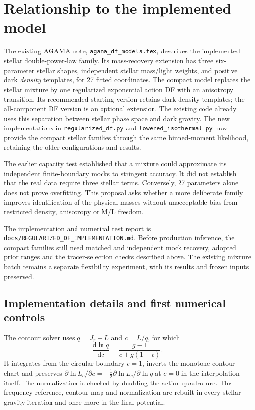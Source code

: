 \documentclass[11pt,a4paper]{article}
\newcommand{\dd}{\mathrm{d}}
\begin{document}
\section{Relationship to the implemented model}

The existing AGAMA note, \texttt{agama\_df\_models.tex}, describes the
implemented stellar double-power-law family. Its mass-recovery extension has
three six-parameter stellar shapes, independent stellar mass/light weights,
and positive dark \emph{density} templates, for 27 fitted coordinates.
The compact model replaces the stellar mixture by one regularized
exponential action DF with an anisotropy transition. Its recommended starting version retains dark density templates; the
all-component DF version is an optional extension. The existing code already
uses this separation between stellar phase space and dark gravity. The new
implementations in \nolinkurl{regularized_df.py} and
\nolinkurl{lowered_isothermal.py} now provide the compact stellar families
through the same binned-moment likelihood, retaining the older configurations
and results.

The earlier capacity test established that a mixture could approximate its
independent finite-boundary mocks to stringent accuracy. It did not establish
that the real data require three stellar terms. Conversely, 27 parameters
alone does not prove overfitting. This proposal asks whether a more deliberate
family improves identification of the physical masses without unacceptable
bias from restricted density, anisotropy or M/L freedom.

The implementation and numerical test report is
\nolinkurl{docs/REGULARIZED_DF_IMPLEMENTATION.md}. Before production inference,
the compact families still need matched and independent mock recovery,
adopted prior ranges and the tracer-selection checks described above. The
existing mixture batch remains a separate flexibility experiment, with its
results and frozen inputs preserved.

\subsection{Implementation details and first numerical controls}

The contour solver uses $q=J_r+L$ and $c=L/q$, for which
\begin{equation}
 \frac{\dd\ln q}{\dd c}=\frac{g-1}{c+g(1-c)}.
\end{equation}
It integrates from the circular boundary $c=1$, inverts the monotone contour
chart and preserves $\partial\ln L_c/\partial c=-\tfrac12
\partial\ln L_c/\partial\ln q$ at $c=0$ in the interpolation itself.
The normalization is checked by doubling the action quadrature. The
frequency reference, contour map and normalization are rebuilt in every
stellar-gravity iteration and once more in the final potential.
\end{document}
